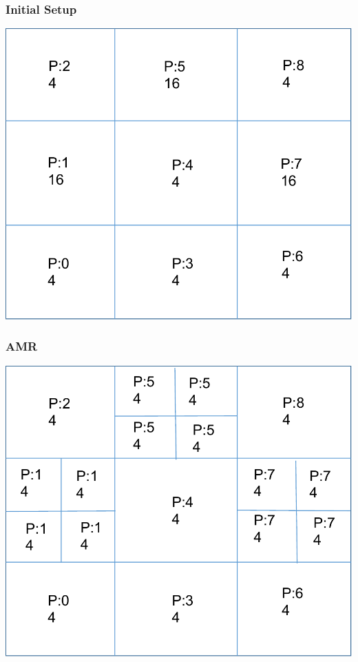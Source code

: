 \documentclass[]{beamer}
\begin{document}
\begin{frame}[t]\frametitle{Initial Setup}
\centering
\includegraphics[scale=0.5]{figures/initial_setup.pdf}
\end{frame}

\begin{frame}[t]\frametitle{AMR}
\centering
\includegraphics[scale=0.5]{figures/amr.pdf}
\end{frame}
\end{document}
